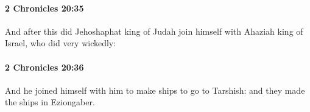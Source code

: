 		\paragraph{2 Chronicles 20:35} %
			\label{2CHRONICLES-20-35}

			And after this did Jehoshaphat king of Judah join himself with Ahaziah king of Israel, who did very wickedly:


		\paragraph{2 Chronicles 20:36} %
			\label{2CHRONICLES-20-36}

			And he joined himself with him to make ships to go to Tarshish: and they made the ships in Eziongaber.


